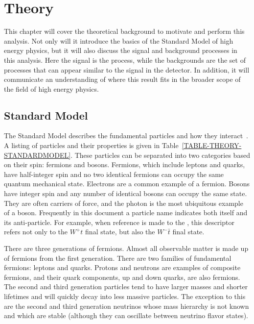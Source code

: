 
\chapter{Theory}
\label{THEORY}
This chapter will cover the theoretical background to motivate and perform this analysis. Not only will it introduce the basics of the Standard Model of high energy physics, but it will also discuss the signal and background processes in this analysis. Here the signal is the \Wtchan process, while the backgrounds are the set of processes that can appear similar to the signal in the detector. In addition, it will communicate an understanding of where this result fits in the broader scope of the field of high energy physics.

\section{Standard Model}
\label{THEORY-STANDARDMODEL}
The Standard Model describes the fundamental particles and how they interact~\cite{PDG, Griffiths}. A listing of particles and their properties is given in Table~\ref{TABLE-THEORY-STANDARDMODEL}. These particles can be separated into two categories based on their spin: fermions and bosons. Fermions, which include leptons and quarks, have half-integer spin and no two identical fermions can occupy the same quantum mechanical state. Electrons are a common example of a fermion. Bosons have integer spin and any number of identical bosons can occupy the same state. They are often carriers of force, and the photon is the most ubiquitous example of a boson. Frequently in this document a particle name indicates both itself and its anti-particle. For example, when reference is made to the \Wtchan, this descriptor refers not only to the $W^+t$ final state, but also the $W^-\bar{t}$ final state.

There are three generations of fermions. Almost all observable matter is made up of fermions from the first generation. There are two families of fundamental fermions: leptons and quarks. Protons and neutrons are examples of composite fermions, and their quark components, up and down quarks, are also fermions. The second and third generation particles tend to have larger masses and shorter lifetimes and will quickly decay into less massive particles. The exception to this are the second and third generation neutrinos whose mass hierarchy is not known and which are stable (although they can oscillate between neutrino flavor states).

